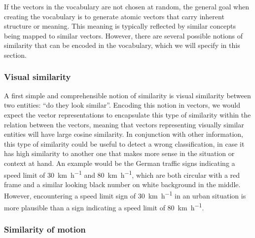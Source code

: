 If the vectors in the vocabulary are not chosen at random, the general goal when creating the vocabulary is to generate atomic vectors that carry inherent structure or meaning.
This meaning is typically reflected by similar concepts being mapped to similar vectors.
However, there are several possible notions of similarity that can be encoded in the vocabulary, which we will specify in this section.

\subsubsection{Visual similarity}%
\label{ssubsec:visual_similarity}

A first simple and comprehensible notion of similarity is visual similarity between two entities: \enquote{do they look similar}. 
Encoding this notion in vectors, we would expect the vector representations to encapsulate this type of similarity within the relation between the vectors, meaning that vectors representing visually similar entities will have large cosine similarity.
In conjunction with other information, this type of similarity could be useful to detect a wrong classification, in case it has high similarity to another one that makes more sense in the situation or context at hand.
An example would be the German traffic signs indicating a speed limit of \SI[per-mode=symbol]{30}{\kilo\meter\per\hour} and \SI[per-mode=symbol]{80}{\kilo\meter\per\hour}, which are both circular with a red frame and a similar looking black number on white background in the middle.
However, encountering a speed limit sign of \SI[per-mode=symbol]{30}{\kilo\meter\per\hour} in an urban situation is more plausible than a sign indicating a speed limit of \SI[per-mode=symbol]{80}{\kilo\meter\per\hour}.

\subsubsection{Similarity of motion}%
\label{ssubsec:similarity_of_motion}


